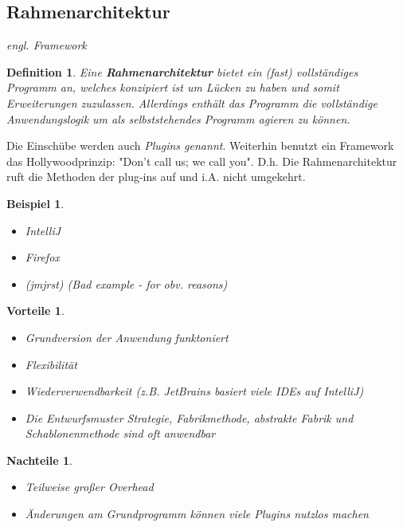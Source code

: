 \documentclass[a4paper]{article}
\theoremstyle{break}
\newtheorem{defi}{Definition}[section]
\newtheorem{ex}{Beispiel}[section]
\newtheorem{why}{Vorteile}[section]
\newtheorem{whynot}{Nachteile}[section]
\begin{document}
\subsection{Rahmenarchitektur}
\textit{engl. Framework}
\begin{defi}
	Eine \textbf{Rahmenarchitektur} bietet ein (fast) vollständiges Programm an, welches konzipiert ist um Lücken zu haben und somit Erweiterungen zuzulassen. Allerdings enthält das Programm die vollständige Anwendungslogik um als selbststehendes Programm agieren zu können.
\end{defi}
Die Einschübe werden auch \textit{Plugins genannt}. Weiterhin benutzt ein Framework das Hollywoodprinzip: "Don't call us; we call you". D.h. Die Rahmenarchitektur ruft die Methoden der plug-ins auf und i.A. nicht umgekehrt.
\begin{ex}
	\begin{itemize}
		\item IntelliJ
		\item Firefox
		\item (jmjrst) \textit{(Bad example - for obv. reasons)}
	\end{itemize}
\end{ex}
\begin{why}
	\begin{itemize}
		\item Grundversion der Anwendung funktoniert
		\item Flexibilität
		\item Wiederverwendbarkeit (z.B. JetBrains basiert viele IDEs auf IntelliJ)
		\item Die Entwurfsmuster Strategie, Fabrikmethode, abstrakte Fabrik und Schablonenmethode sind oft anwendbar
	\end{itemize}
\end{why}
\begin{whynot}
	\begin{itemize}
		\item Teilweise großer Overhead
		\item Änderungen am Grundprogramm können viele Plugins nutzlos machen
	\end{itemize}
\end{whynot}
\end{document}
